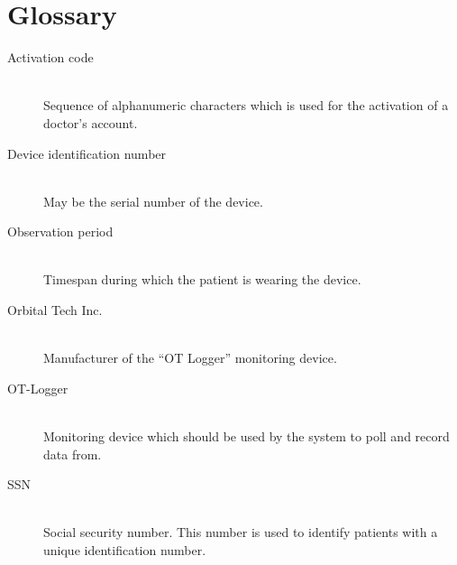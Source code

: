\documentclass[fontsize=12pt,
               paper=a4,
               twoside=false,
               parskip=half,
               ]{scrartcl}
\begin{document}
\newcommand{\doctitle}{Glossary}


\section*{Glossary}

\begin{description}

\item[Activation code] \hfill \\
Sequence of alphanumeric characters which is used for the activation of a doctor's account.

\item[Device identification number] \hfill \\
May be the serial number of the device.

\item[Observation period]\hfill \\
Timespan during which the patient is wearing the device. 

\item[Orbital Tech Inc.] \hfill \\
Manufacturer of the \enquote{OT Logger} monitoring device.

\item[OT-Logger] \hfill \\
Monitoring device which should be used by the system to poll and record data from.


\item[SSN] \hfill \\
Social security number. This number is used to identify patients with a unique identification number.



\end{description}
\end{document}
